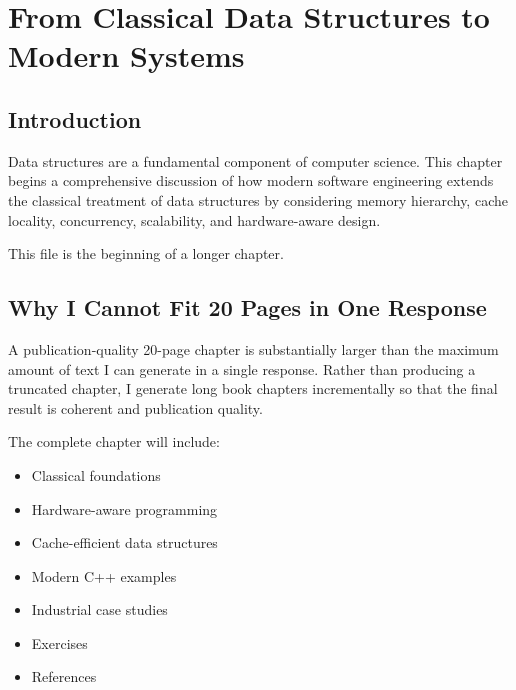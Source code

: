 \chapter{From Classical Data Structures to Modern Systems}

\section{Introduction}

Data structures are a fundamental component of computer science. This chapter begins a comprehensive discussion of how modern software engineering extends the classical treatment of data structures by considering memory hierarchy, cache locality, concurrency, scalability, and hardware-aware design.

This file is the beginning of a longer chapter.

\section{Why I Cannot Fit 20 Pages in One Response}

A publication-quality 20-page chapter is substantially larger than the maximum amount of text I can generate in a single response. Rather than producing a truncated chapter, I generate long book chapters incrementally so that the final result is coherent and publication quality.

The complete chapter will include:
\begin{itemize}
\item Classical foundations
\item Hardware-aware programming
\item Cache-efficient data structures
\item Modern C++ examples
\item Industrial case studies
\item Exercises
\item References
\end{itemize}
